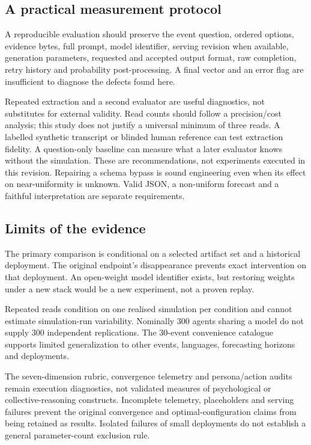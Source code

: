 \documentclass[10pt,conference]{IEEEtran}
\begin{document}
\subsection{A practical measurement protocol}
A reproducible evaluation should preserve the event question, ordered options,
evidence bytes, full prompt, model identifier, serving revision when available,
generation parameters, requested and accepted output format, raw completion,
retry history and probability post-processing. A final vector and an error
flag are insufficient to diagnose the defects found here.

Repeated extraction and a second evaluator are useful diagnostics, not substitutes
for external validity. Read counts should follow a precision/cost analysis;
this study does not justify a universal minimum of three reads. A labelled
synthetic transcript or blinded human reference can test extraction fidelity.
A question-only baseline can measure what a later evaluator knows without
the simulation. These are recommendations, not experiments executed in this
revision. Repairing a schema bypass is sound engineering even when its effect
on near-uniformity is unknown. Valid JSON, a non-uniform forecast and a faithful
interpretation are separate requirements.

\subsection{Limits of the evidence}
The primary comparison is conditional on a selected artifact set and a historical
deployment. The original endpoint's disappearance prevents exact intervention
on that deployment. An open-weight model identifier exists, but restoring
weights under a new stack would be a new experiment, not a proven replay.

Repeated reads condition on one realised simulation per condition and cannot
estimate simulation-run variability. Nominally 300 agents sharing a model do
not supply 300 independent replications. The 30-event convenience catalogue
supports limited generalization to other events, languages, forecasting horizons
and deployments.

The seven-dimension rubric, convergence telemetry and persona/action audits
remain execution diagnostics, not validated measures of psychological or
collective-reasoning constructs. Incomplete telemetry, placeholders and serving
failures prevent the original convergence and optimal-configuration claims
from being retained as results. Isolated failures of small deployments do not
establish a general parameter-count exclusion rule.
\end{document}
